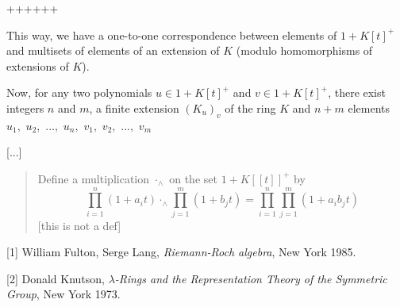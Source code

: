 \documentclass[12pt,final,notitlepage,onecolumn,german]{article}%
\begin{document}
++++++

This way, we have a one-to-one correspondence between elements of $1+K\left[
t\right]  ^{+}$ and multisets of elements of an extension of $K$ (modulo
homomorphisms of extensions of $K$).

Now, for any two polynomials $u\in1+K\left[  t\right]  ^{+}$ and
$v\in1+K\left[  t\right]  ^{+}$, there exist integers $n$ and $m$, a finite
extension $\left(  K_{u}\right)  _{v}$ of the ring $K$ and $n+m$ elements
$u_{1},$ $u_{2},$ $...,$ $u_{n},$ $v_{1},$ $v_{2},$ $...,$ $v_{m}$

[...]

\begin{quote}
Define a multiplication $\cdot_{\wedge}$ on the set $1+K\left[  \left[
t\right]  \right]  ^{+}$ by%
\[
\prod_{i=1}^{n}\left(  1+a_{i}t\right)  \cdot_{\wedge}\prod_{j=1}^{m}\left(
1+b_{j}t\right)  =\prod_{i=1}^{n}\prod_{j=1}^{m}\left(  1+a_{i}b_{j}t\right)
\]
[this is not a def]
\end{quote}

\begin{center}
\end{center}

[1] William Fulton, Serge Lang, \textit{Riemann-Roch algebra}, New York 1985.

[2] Donald Knutson, $\lambda$\textit{-Rings and the Representation Theory of
the Symmetric Group}, New York 1973.
\end{document}
